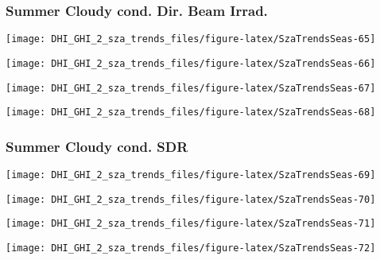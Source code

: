 \documentclass[
  10pt,
  a4paper,oneside]{article}
\begin{document}
\newpage

\hypertarget{summer-cloudy-cond.-dir.-beam-irrad.}{%
\subsubsection{Summer Cloudy cond. Dir. Beam Irrad.}\label{summer-cloudy-cond.-dir.-beam-irrad.}}

\begin{center}\texttt{[image: DHI\_GHI\_2\_sza\_trends\_files/figure-latex/SzaTrendsSeas-65]} \end{center}

\begin{center}\texttt{[image: DHI\_GHI\_2\_sza\_trends\_files/figure-latex/SzaTrendsSeas-66]} \end{center}

\begin{center}\texttt{[image: DHI\_GHI\_2\_sza\_trends\_files/figure-latex/SzaTrendsSeas-67]} \end{center}

\begin{center}\texttt{[image: DHI\_GHI\_2\_sza\_trends\_files/figure-latex/SzaTrendsSeas-68]} \end{center}

\newpage

\hypertarget{summer-cloudy-cond.-sdr}{%
\subsubsection{Summer Cloudy cond. SDR}\label{summer-cloudy-cond.-sdr}}

\begin{center}\texttt{[image: DHI\_GHI\_2\_sza\_trends\_files/figure-latex/SzaTrendsSeas-69]} \end{center}

\begin{center}\texttt{[image: DHI\_GHI\_2\_sza\_trends\_files/figure-latex/SzaTrendsSeas-70]} \end{center}

\begin{center}\texttt{[image: DHI\_GHI\_2\_sza\_trends\_files/figure-latex/SzaTrendsSeas-71]} \end{center}

\begin{center}\texttt{[image: DHI\_GHI\_2\_sza\_trends\_files/figure-latex/SzaTrendsSeas-72]} \end{center}
\end{document}
